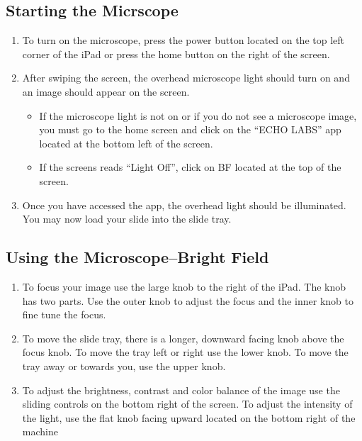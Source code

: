 \documentclass{article}
\begin{document}
\subsection{Starting the Micrscope}

\begin{enumerate}
  \item To turn on the microscope, press the power button located on the top left corner of the iPad or press the home button on the right of the screen.
  \item After swiping the screen, the overhead microscope light should turn on and an image should appear on the screen.
  
\begin{itemize}
  \item If the microscope light is not on or if you do not see a microscope image, you must go to the home screen and click on the “ECHO LABS” app located at the bottom left of the screen.
  \item If the screens reads “Light Off”, click on BF located at the top of the screen.
\end{itemize}

  \item Once you have accessed the app, the overhead light should be illuminated. You may now load your slide into the slide tray.
\end{enumerate} 
  
\subsection{Using the Microscope--Bright Field} 

\begin{enumerate}
  \item To focus your image use the large knob to the right of the iPad. The knob has two parts. Use the outer knob to adjust the focus and the inner knob to fine tune the focus.
  \item To move the slide tray, there is a longer, downward facing knob above the focus knob. To move the tray left or right use the lower knob. To move the tray away or towards you, use the upper knob.
  \item To adjust the brightness, contrast and color balance of the image use the sliding controls on the bottom right of the screen. To adjust the intensity of the light, use the flat knob facing upward located on the bottom right of the machine
  
\end{enumerate}
\end{document}
